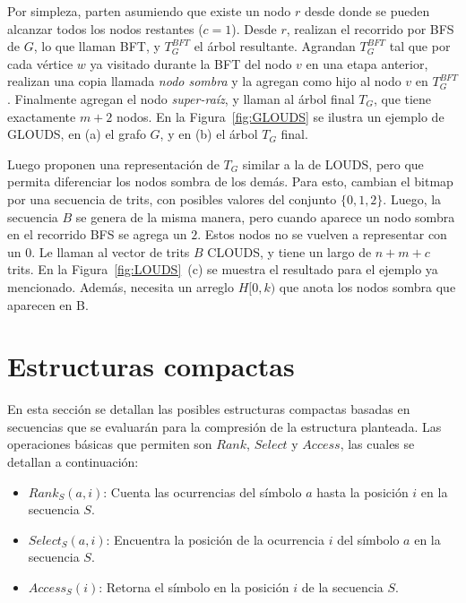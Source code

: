 Por simpleza, parten asumiendo que existe un nodo $r$ desde donde se pueden alcanzar todos los nodos restantes ($c = 1$). Desde $r$, realizan el recorrido por BFS de $G$, lo que llaman BFT, y $T_{G}^{BFT}$ el árbol resultante. Agrandan $T_{G}^{BFT}$ tal que por cada vértice $w$ ya visitado durante la BFT del nodo $v$ en una etapa anterior, realizan una copia llamada \textit{nodo sombra} y la agregan como hijo al nodo $v$ en $T_{G}^{BFT}$. Finalmente agregan el nodo \textit{super-raíz}, y llaman al árbol final $T_{G}$, que tiene exactamente $m + 2$ nodos. En la Figura~\ref{fig:GLOUDS} se ilustra un ejemplo de GLOUDS, en (a) el grafo $G$, y en (b) el árbol $T_{G}$ final.



Luego proponen una representación de $T_{G}$ similar a la de LOUDS, pero que permita diferenciar los nodos sombra de los demás. Para esto, cambian el bitmap por una secuencia de trits, con posibles valores del conjunto $\{0, 1, 2\}$. Luego, la secuencia $B$ se genera de la misma manera, pero cuando aparece un nodo sombra en el recorrido BFS se agrega un $2$. Estos nodos no se vuelven a representar con un $0$. Le llaman al vector de trits $B$ CLOUDS, y tiene un largo de $n + m + c$ trits. En la Figura~\ref{fig:LOUDS}~(c) se muestra el resultado para el ejemplo ya mencionado. Además, necesita un arreglo $H[0, k)$ que anota los nodos sombra que aparecen en B.



\section{Estructuras compactas} \label{sec:compactEstruct}
En esta sección se detallan las posibles estructuras compactas basadas en secuencias que se evaluarán para la compresión de la estructura planteada. Las operaciones básicas que permiten son \textbf{$Rank$}, \textbf{$Select$} y \textbf{$Access$}, las cuales se detallan a continuación:

\begin{itemize}
	\item \textbf{$Rank_{S}(a, i)$}: Cuenta las ocurrencias del símbolo $a$ hasta la posición $i$ en la secuencia $S$.
	\item \textbf{$Select_{S}(a, i)$}: Encuentra la posición de la ocurrencia $i$ del símbolo $a$ en la secuencia $S$.
	\item \textbf{$Access_{S}(i)$}: Retorna el símbolo en la posición $i$ de la secuencia $S$.
\end{itemize}

